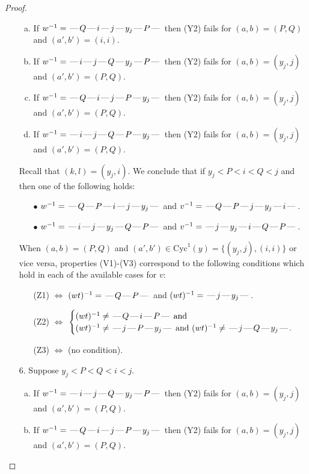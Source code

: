 \documentclass[10pt]{article}
\theoremstyle{definition}
\theoremstyle{definition}
\def\dash{\text{\hspace{0.5mm}---\hspace{0.5mm}}}
\def\Cyc{\mathrm{Cyc}}
\begin{document}
\begin{proof}
\begin{enumerate}
\begin{enumerate}[(a)]
\item If $w^{-1} = \dash Q\dash i\dash j\dash y_j\dash P\dash $ then (Y2) fails for $(a,b)=(P,Q)$ and $(a',b')=(i,i)$.
\item If $w^{-1} = \dash i\dash j\dash Q\dash y_j\dash P\dash $ then (Y2) fails for $(a,b)=(y_j,j)$ and $(a',b')=(P,Q)$.
\item If $w^{-1} = \dash Q\dash i\dash j\dash P\dash y_j\dash $ then (Y2) fails for $(a,b)=(y_j,j)$ and $(a',b')=(P,Q)$.
\item If $w^{-1} = \dash i\dash j\dash Q\dash P\dash y_j\dash $ then (Y2) fails for $(a,b)=(y_j,j)$ and $(a',b')=(P,Q)$.
\end{enumerate}
Recall that $(k,l) = (y_j,i)$.
We conclude that if $y_j < P < i < Q < j$ and then one of the following holds:
\begin{enumerate}
\item[$\bullet$] $w^{-1} = \dash Q\dash P\dash i\dash j\dash y_j\dash $ and $v^{-1} = \dash Q\dash P\dash j\dash y_j\dash i\dash $.
\item[$\bullet$] $w^{-1} = \dash i\dash j\dash y_j\dash Q\dash P\dash $ and $v^{-1} = \dash j\dash y_j\dash i\dash Q\dash P\dash $.
\end{enumerate}
When $(a,b)= (P,Q)$ and $(a',b')\in \Cyc^1(y)=\{(y_j,j),(i,i)\}$ or vice versa,
properties (V1)-(V3) correspond to the following conditions which hold in
each of the available cases for $v$:
\begin{enumerate}
\item[](Z1) $\Leftrightarrow$ $(wt)^{-1} = \dash Q \dash P \dash$  and $(wt)^{-1} = \dash j \dash y_j \dash$.
\item[](Z2) $\Leftrightarrow$ $\begin{cases}\text{$(wt)^{-1} \neq \dash Q \dash i \dash P \dash$}\text{ and }\\
\text{$(wt)^{-1} \neq \dash j \dash P \dash y_j \dash$ and $(wt)^{-1}\neq \dash j \dash Q \dash y_j \dash$}.\end{cases}$
\item[](Z3) $\Leftrightarrow$ (no condition).
\end{enumerate}
\item[$6$.] Suppose $y_j < P < Q < i < j$.
\begin{enumerate}[(a)]
\item If $w^{-1} = \dash i\dash j\dash Q\dash y_j\dash P\dash $ then (Y2) fails for $(a,b)=(y_j,j)$ and $(a',b')=(P,Q)$.
\item If $w^{-1} = \dash Q\dash i\dash j\dash P\dash y_j\dash $ then (Y2) fails for $(a,b)=(y_j,j)$ and $(a',b')=(P,Q)$.

\end{enumerate}
\end{enumerate}
\end{proof}
\end{document}

